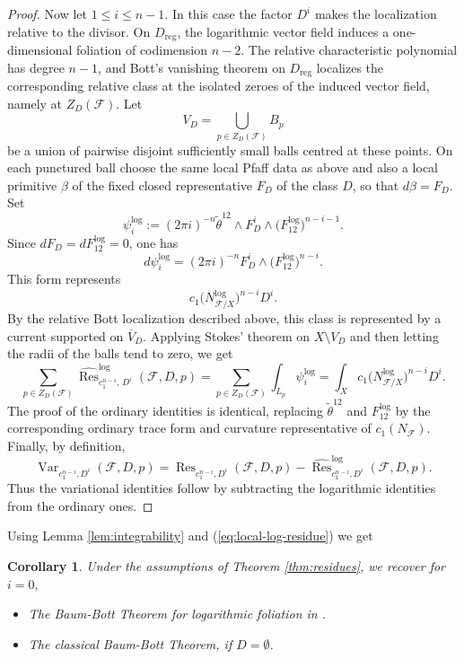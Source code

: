 \documentclass[12pt,reqno,a4paper]{amsart}
\numberwithin{equation}{section}
\theoremstyle{plain}
\newtheorem{corollary}[corollary]{Corollary}
\theoremstyle{definition}
\DeclareMathOperator{\Var}{Var}
\newcommand{\cF}{\mathcal{F}}
\begin{document}
\begin{proof}
Now let \(1\leq i\leq n-1\). In this case the factor \(D^i\) makes the
localization relative to the divisor. On \(D_{\mathrm{reg}}\), the logarithmic
vector field induces a one-dimensional foliation of codimension \(n-2\). The
relative characteristic polynomial has degree \(n-1\), and Bott's vanishing
theorem on \(D_{\mathrm{reg}}\) localizes the corresponding relative class at
the isolated zeroes of the induced vector field, namely at \(Z_D(\cF)\).
Let
\[
V_D=\bigcup_{p\in Z_D(\cF)}B_p
\]
be a union of pairwise disjoint sufficiently small balls centred at these
points. On each punctured ball choose the same local Pfaff data as above and
also a local primitive \(\beta\) of the fixed closed representative \(F_D\) of
the class \(D\), so that \(d\beta=F_D\). Set
\[
\psi_i^{\log}
:=
(2\pi i)^{-n}
\widetilde\theta^{12}\wedge
F_D^i\wedge
\bigl(F_{12}^{\log}\bigr)^{n-i-1}.
\]
Since \(dF_D=dF_{12}^{\log}=0\), one has
\[
d\psi_i^{\log}
=
(2\pi i)^{-n}
F_D^i\wedge
\bigl(F_{12}^{\log}\bigr)^{n-i}.
\]
This form represents
\[
c_1\bigl(N_{\cF/X}^{\log}\bigr)^{n-i}D^i.
\]
By the relative Bott localization described above, this class is represented
by a current supported on \(\overline V_D\). Applying Stokes' theorem on
\(X\setminus V_D\) and then letting the radii of the balls tend to zero, we get
\[
\sum_{p\in Z_D(\cF)}
\widehat{\operatorname{Res}}^{\log}_{c_1^{n-i},\,D^i}(\cF,D,p)
=
\sum_{p\in Z_D(\cF)}
\int_{L_p}\psi_i^{\log}
=
\int_X
c_1\bigl(N_{\cF/X}^{\log}\bigr)^{n-i}D^i.
\]
The proof of the ordinary identities is identical, replacing
\(\widetilde\theta^{12}\) and \(F_{12}^{\log}\) by the corresponding ordinary
trace form and curvature representative of \(c_1(N_{\cF})\). Finally, by
definition,
\[
\operatorname{Var}_{c_1^{n-i},D^i}(\cF,D,p)
=
\operatorname{Res}_{c_1^{n-i},D^i}(\cF,D,p)
-
\widehat{\operatorname{Res}}^{\log}_{c_1^{n-i},D^i}(\cF,D,p).
\]
Thus the variational identities follow by subtracting the logarithmic
identities from the ordinary ones.
\end{proof}
 Using Lemma \ref{lem:integrability} and (\ref{eq:local-log-residue}) we get

\begin{corollary}
Under the assumptions of Theorem \ref{thm:residues}, we recover for $i=0,$

\begin{itemize}
\item[(a)] The Baum-Bott Theorem for logarithmic foliation in \cite[Theorem~1.2]{CoLoMa}. 
\item[(b)] The classical Baum-Bott Theorem, if $D= \emptyset$.
\end{itemize}
\end{corollary}
\end{document}

